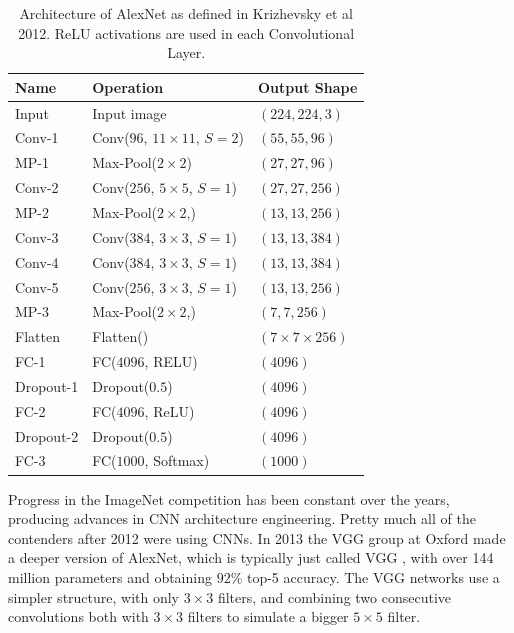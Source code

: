 \begin{table}[t]
    \centering
    \begin{tabular}{@{}lll@{}}
        \hline
        Name					& Operation 							& Output Shape\\
        \hline
        Input					& Input image							& $(224, 224, 3)$ \\
        \hline
        Conv-1					& Conv($96$, $11 \times 11$, $S = 2$)	& $(55, 55, 96)$ \\
        MP-1					& Max-Pool($2 \times 2$)				& $(27, 27, 96)$ \\
        Conv-2					& Conv($256$, $5 \times 5$, $S = 1$)	& $(27, 27, 256)$ \\
        MP-2					& Max-Pool($2 \times 2$,)				& $(13, 13, 256)$ \\
        Conv-3					& Conv($384$, $3 \times 3$, $S = 1$)	& $(13, 13, 384)$ \\
        Conv-4					& Conv($384$, $3 \times 3$, $S = 1$)	& $(13, 13, 384)$ \\
        Conv-5					& Conv($256$, $3 \times 3$, $S = 1$)	& $(13, 13, 256)$ \\
        MP-3					& Max-Pool($2 \times 2$,)				& $(7, 7, 256)$ \\
        Flatten					& Flatten()								& $(7 \times 7 \times 256)$\\
        \hline
        FC-1					& FC($4096$, RELU)						& $(4096)$\\
        Dropout-1				& Dropout($0.5$)						& $(4096)$\\
        FC-2					& FC($4096$, ReLU)						& $(4096)$\\
        Dropout-2				& Dropout($0.5$)						& $(4096)$\\
        \hline
        FC-3					& FC($1000$, Softmax)					& $(1000)$\\
        \hline
    \end{tabular}
    \caption[Architecture of AlexNet as defined in Krizhevsky et al 2012]{Architecture of AlexNet as defined in Krizhevsky et al 2012. ReLU activations are used in each Convolutional Layer.}
    \label{background:alexnet}
\end{table}

Progress in the ImageNet competition has been constant over the years, producing advances in CNN architecture engineering. Pretty much all of the contenders after 2012 were using CNNs. In 2013 the VGG group at Oxford made a deeper version of AlexNet, which is typically just called VGG \cite{simonyan2014very}, with over 144 million parameters and obtaining $92 \%$ top-5 accuracy. The VGG networks use a simpler structure, with only $3 \times 3$ filters, and combining two consecutive convolutions both with $3 \times 3$ filters to simulate a bigger $5 \times 5$ filter.

